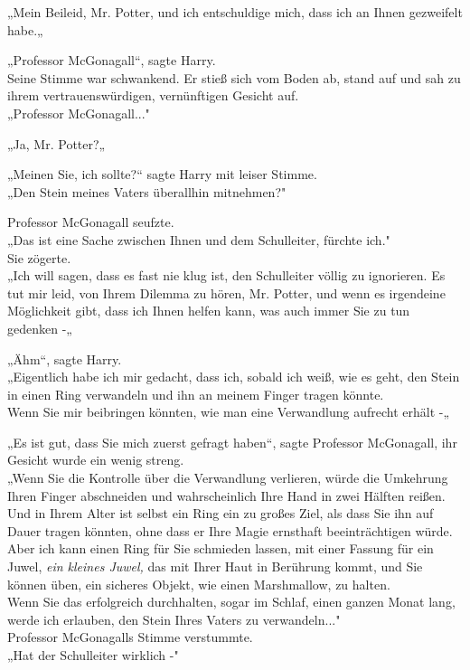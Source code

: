 {„Mein Beileid, Mr. Potter, und ich entschuldige mich, dass ich an Ihnen gezweifelt habe.„

„Professor McGonagall“, sagte Harry.\\ Seine Stimme war schwankend. Er stieß sich vom Boden ab, stand auf und sah zu ihrem vertrauenswürdigen, vernünftigen Gesicht auf.\\ „Professor McGonagall..."

„Ja, Mr. Potter?„

„Meinen Sie, ich sollte?“ sagte Harry mit leiser Stimme.\\ „Den Stein meines Vaters überallhin mitnehmen?"

Professor McGonagall seufzte.\\ „Das ist eine Sache zwischen Ihnen und dem Schulleiter, fürchte ich."\\ Sie zögerte.\\ „Ich will sagen, dass es fast nie klug ist, den Schulleiter völlig zu ignorieren. Es tut mir leid, von Ihrem Dilemma zu hören, Mr. Potter, und wenn es irgendeine Möglichkeit gibt, dass ich Ihnen helfen kann, was auch immer Sie zu tun gedenken -„

„Ähm“, sagte Harry.\\ „Eigentlich habe ich mir gedacht, dass ich, sobald ich weiß, wie es geht, den Stein in einen Ring verwandeln und ihn an meinem Finger tragen könnte.\\ Wenn Sie mir beibringen könnten, wie man eine Verwandlung aufrecht erhält -„

„Es ist gut, dass Sie mich zuerst gefragt haben“, sagte Professor McGonagall, ihr Gesicht wurde ein wenig streng.\\ „Wenn Sie die Kontrolle über die Verwandlung verlieren, würde die Umkehrung Ihren Finger abschneiden und wahrscheinlich Ihre Hand in zwei Hälften reißen.\\ Und in Ihrem Alter ist selbst ein Ring ein zu großes Ziel, als dass Sie ihn auf Dauer tragen könnten, ohne dass er Ihre Magie ernsthaft beeinträchtigen würde.\\ Aber ich kann einen Ring für Sie schmieden lassen, mit einer Fassung für ein Juwel, \emph{ein kleines Juwel,} das mit Ihrer Haut in Berührung kommt, und Sie können üben, ein sicheres Objekt, wie einen Marshmallow, zu halten.\\ Wenn Sie das erfolgreich durchhalten, sogar im Schlaf, einen ganzen Monat lang, werde ich erlauben, den Stein Ihres Vaters zu verwandeln..."\\ Professor McGonagalls Stimme verstummte.\\ „Hat der Schulleiter wirklich -"

}
